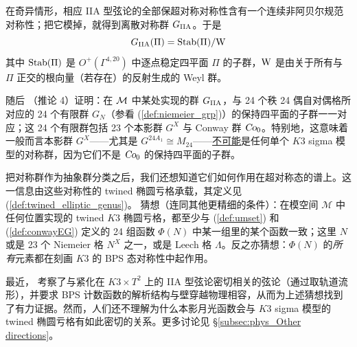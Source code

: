 \documentclass[11pt,a4paper,fontset=windows]{ctexart}
\numberwithin{equation}{section}
\newcommand{\Co}{\operatorname{\textsl{Co}}}      %
\newcommand{\M}{\mathcal{M}}
\newcommand{\be}{\begin{equation}}
\newcommand{\ee}{\end{equation}}
\newcommand{\eq}[1]{(\ref{#1})}
\begin{document}
在奇异情形，相应 IIA 型弦论的全部保超对称对称性含有一个连续非阿贝尔规范对称性；把它模掉，就得到离散对称群 $G_{\rm IIA}$。于是
\be
G_{\rm IIA}(\Pi) = {\rm Stab}(\Pi)/{\rm W} 
\ee
其中 ${\rm Stab}(\Pi)$ 是 $O^+(\Gamma^{4,20})$ 中逐点稳定四平面 $\Pi$ 的子群，${\rm W}$ 是由关于所有与 $\Pi$ 正交的根向量（若存在）的反射生成的 Weyl 群。


随后 \cite{ChengMirandaC.N.2016KSTL}（推论 4）证明：在 ${\cal M}$ 中某处实现的群 $G_{\rm IIA}$，与 24 个秩 24 偶自对偶格所对应的 24 个有限群 $G_N$（参看 \eq{def:niemeier_grp}）的保持四平面的子群一一对应；这 24 个有限群包括 23 个本影群 $G^X$ 与 Conway 群 $\Co_0$。特别地，这意味着一般而言本影群 $G^X$——尤其是 $G^{24A_1}\cong M_{24}$——{\underline{不可能}}是任何单个 $K3$ sigma 模型的对称群，因为它们不是 $\Co_0$ 的保持四平面的子群。


把对称群作为抽象群分类之后，我们还想知道它们如何作用在超对称态的谱上。这一信息由这些对称性的 twined 椭圆亏格承载，其定义见 \eq{def:twined_elliptic_genus}。\cite{ChengMirandaC.N.2016KSTL} 猜想（连同其他更精细的条件）：在模空间 ${\M}$ 中任何位置实现的 twined $K3$ 椭圆亏格，都至少与 \eq{def:umset} 和 \eq{def:conwayEG} 定义的 24 组函数 $\Phi(N)$ 中某一组里的某个函数一致；这里 $N$ 或是 23 个 Niemeier 格 $N^X$ 之一，或是 Leech 格 $\Lambda$。反之亦猜想：$\Phi(N)$ 的{\it 所有}元素都在刻画 $K3$ 的 BPS 态对称性中起作用。


最近，\cite{Paquette:2017gmb} 考察了与紧化在 $K3 \times T^2$ 上的 IIA 型弦论密切相关的弦论（通过取轨道流形），并要求 BPS 计数函数的解析结构与壁穿越物理相容，从而为上述猜想找到了有力证据。然而，人们还不理解为什么本影月光函数会与 $K3$ sigma 模型的 twined 椭圆亏格有如此密切的关系。更多讨论见 \S\ref{subsec:phys_Other directions}。
\end{document}
